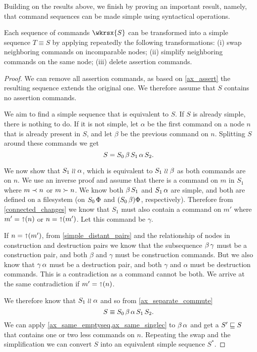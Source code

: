Building on the results above, we finish by proving an important result,
namely, that command sequences can be made simple using syntactical operations.

\begin{mylem}
Each sequence of commands $\wkrsx{S}$
can be transformed into a simple sequence
$T\equiv S$ by applying repeatedly the following transformations:
{\rm(i)} swap neighboring commands on incomparable nodes;
{\rm(ii)} simplify neighboring commands on the same node;
{\rm(iii)} delete assertion commands.
\end{mylem}
\begin{proof}
We can remove all assertion commands, as based on
\cref{ax_assert} the resulting sequence extends the original one.
We therefore assume that $S$ contains no assertion commands.

\newcommand{\ucx}{\alpha}
\newcommand{\ucy}{\beta}
\newcommand{\ucz}{\gamma}

We aim to find a simple sequence that is equivalent to $S$.
If $S$ is already simple, there is nothing to do.
If it is not simple, let $\ucx$ be the first command
on a node $n$ that is already present in $S$,
and let $\ucy$ be the previous command on $n$.
Splitting $S$ around these commands we get
\[ S = S_0 \cc \ucy \cc S_1 \cc \ucx \cc S_2. \]

We now show that $S_1\indep\ucx$,
which is equivalent to $S_1\indep\ucy$ as both commands are on $n$.
We use an inverse proof and assume that there is a command on $m$ in $S_1$
where $m\prec n$ or $m\succ n$.
We know both $\ucy\cc S_1$ and $S_1\cc\ucx$ are simple,
and both are defined on a filesystem
(on $S_0\,\Phi$ and $(S_0\,\beta)\Phi$, respectively).
Therefore from \cref{connected_changes} we know that
$S_1$ must also contain a command on $m'$ where
$m'=\mathord{\shortuparrow}({n})$ or $n=\mathord{\shortuparrow}({m'})$.
Let this command be $\ucz$.

If $n=\mathord{\shortuparrow}({m'})$,
from \cref{simple_distant_pairs} 
and the relationship of nodes in construction and destruction pairs
we know that the subsequence
$\ucy\cc\ucz$ must be a construction pair,
and both $\ucy$ and $\ucz$ must be construction commands.
But we also know that $\ucz\cc\ucx$ must be a destruction pair,
and both $\ucz$ and $\ucx$ must be destruction commands.
This is a contradiction as a command cannot be both.
We arrive at the same contradiction if $m'=\mathord{\shortuparrow}({n})$.

We therefore know that $S_1\indep\ucx$ and so
from \cref{ax_separate_commute}
\[ S \equiv S_0\cc\ucy\cc\ucx\cc S_1 \cc S_2. \]
We can apply \cref{ax_same_emptyseq,ax_same_singlec} to
$\ucy\cc\ucx$ and get a $S'\sqsubseteq S$ that contains one or two less commands on $n$.
Repeating the swap and the simplification we
can convert $S$ into an equivalent simple sequence $S^*$.
\end{proof}



